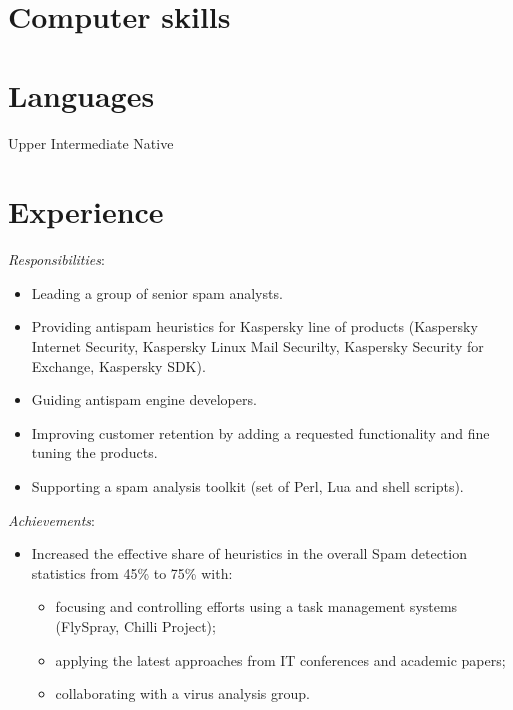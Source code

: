 \documentclass[11pt,a4paper,sans]{moderncv}        %
\newcommand{\responsibilities}[1]{ \emph{Responsibilities}:\begin{itemize} #1\end{itemize}}
\newcommand{\achievements}[1]{ \emph{Achievements}:\begin{itemize} #1\end{itemize}}
\begin{document}
\makecvtitle


\section{Computer skills}


\section{Languages}
     Upper Intermediate\hfill 
     Native \hfill 


\section{Experience}

 {
    \responsibilities {
        \item Leading a group of senior spam analysts.
        \item Providing antispam heuristics for Kaspersky line of products (Kaspersky Internet Security, Kaspersky Linux Mail Securilty, Kaspersky Security for Exchange, Kaspersky SDK).
        \item Guiding antispam engine developers.
        \item Improving customer retention by adding a requested functionality and fine tuning the products.
        \item Supporting a spam analysis toolkit (set of Perl, Lua and shell scripts).
    }
    \achievements {
        \item Increased the effective share of heuristics in the overall Spam detection statistics from 45\% to 75\% with:
        \begin{itemize}
            \item focusing and controlling efforts using a task management systems (FlySpray, Chilli Project);
            \item applying the latest approaches from IT conferences and academic papers;
            \item collaborating with a virus analysis group.
        \end{itemize}
    }
}
\end{document}
